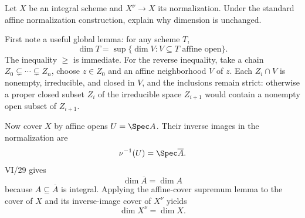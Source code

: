 \begin{problem}\label{prob:vi30-09}
Let \(X\) be an integral scheme and \(X^\nu\to X\) its normalization. Under the standard affine normalization construction, explain why dimension is unchanged.

\end{problem}

\ifdefined\FullProblemDossiers
\begin{solution}
First note a useful global lemma: for any scheme \(T\),
\[
\dim T=\sup\{\dim V:V\subseteq T\text{ affine open}\}.
\]
The inequality \(\ge\) is immediate. For the reverse inequality, take a chain
\(Z_0\subsetneq\cdots\subsetneq Z_n\), choose \(z\in Z_0\) and an affine neighborhood \(V\) of \(z\). Each
\(Z_i\cap V\) is nonempty, irreducible, and closed in \(V\), and the inclusions remain strict: otherwise a proper
closed subset \(Z_i\) of the irreducible space \(Z_{i+1}\) would contain a nonempty open subset of \(Z_{i+1}\).

Now cover \(X\) by affine opens \(U=\Spec A\). Their inverse images in the normalization are
\[
\nu^{-1}(U)=\Spec\overline A.
\]
VI/29 gives
\[
\dim\overline A=\dim A
\]
because \(A\subseteq\overline A\) is integral. Applying the affine-cover supremum lemma to the cover of \(X\) and
its inverse-image cover of \(X^\nu\) yields
\[
\boxed{\dim X^\nu=\dim X}.
\]
\end{solution}
\fi
